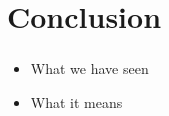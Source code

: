 \documentclass[10pt,aspectratio=169]{beamer}
\begin{document}
       
	\section{Conclusion}
	\begin{frame}
		\frametitle{\insertsection}
		\framesubtitle{\insertsubsection}	 
        \begin{itemize}
        \item What we have seen
        \item What it means
        \end{itemize}
	\end{frame}
	\appendix
	
\end{document}
